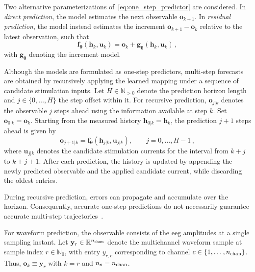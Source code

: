 Two alternative parameterizations of~\eqref{eq:one_step_predictor} are considered.
In \emph{direct prediction}, the model estimates the next observable $\mathbf{o}_{k+1}$.
In \emph{residual prediction}, the model instead estimates the increment $\mathbf{o}_{k+1}-\mathbf{o}_k$ relative to the latest observation, such that
\begin{equation*}
    \mathbf{f}_{\boldsymbol{\theta}}
    \left(\mathbf{h}_k,\mathbf{u}_k\right)
    =
    \mathbf{o}_k
    +
    \mathbf{g}_{\boldsymbol{\theta}}
    \left(\mathbf{h}_k,\mathbf{u}_k\right)\,,
\end{equation*}
with $\mathbf{g}_{\boldsymbol{\theta}}$ denoting the increment model.

Although the models are formulated as one-step predictors, multi-step forecasts are obtained by recursively applying the learned mapping under a sequence of candidate stimulation inputs.
Let $H\in\mathbb{N}_{>0}$ denote the prediction horizon length and $j\in\{0,\ldots,H\}$ the step offset within it.
For recursive prediction, $\mathbf{o}_{j|k}$ denotes the observable $j$ steps ahead using the information available at step $k$.
Set $\mathbf{o}_{0|k}=\mathbf{o}_k$.
Starting from the measured history $\mathbf{h}_{0|k}=\mathbf{h}_k$, the prediction $j+1$ steps ahead is given by
\begin{equation}
    \mathbf{o}_{j+1|k}
    =
    \mathbf{f}_{\boldsymbol{\theta}}
    \left(
        \mathbf{h}_{j|k},
        \mathbf{u}_{j|k}
    \right),
    \qquad j=0,\ldots,H-1\,,
    \label{eq:recursive_predictor}
\end{equation}
where $\mathbf{u}_{j|k}$ denotes the candidate stimulation currents for the interval from $k+j$ to $k+j+1$.
After each prediction, the history is updated by appending the newly predicted observable and the applied candidate current, while discarding the oldest entries.

During recursive prediction, errors can propagate and accumulate over the horizon.
Consequently, accurate one-step predictions do not necessarily guarantee accurate multi-step trajectories~\cite{Farina2011}.

For waveform prediction, the observable consists of the \ac{eeg} amplitudes at a single sampling instant.
Let $\mathbf{y}_r\in\mathbb R^{n_{\mathrm{chan}}{}}$ denote the multichannel waveform sample at sample index $r\in\mathbb N_0$, with entry $y_{r,c}$ corresponding to channel $c\in\{1,\ldots,n_{\mathrm{chan}}{}\}$.
Thus, $\mathbf{o}_k\equiv\mathbf{y}_r$ with $k=r$ and $n_{o}=n_{\mathrm{chan}}{}$.

